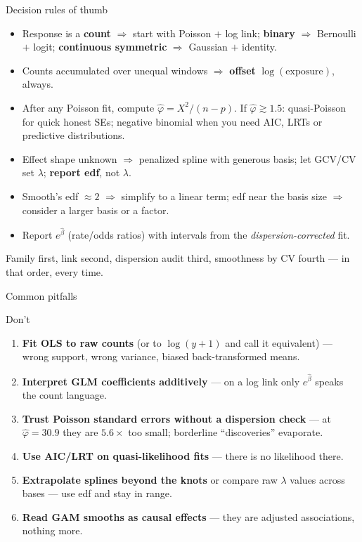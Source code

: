 \documentclass[aspectratio=169,11pt]{beamer}
\begin{document}
\begin{frame}{Decision rules of thumb}
  \begin{itemize}
    \item Response is a \textbf{count} $\Rightarrow$ start with Poisson $+$ log link;
          \textbf{binary} $\Rightarrow$ Bernoulli $+$ logit; \textbf{continuous
          symmetric} $\Rightarrow$ Gaussian $+$ identity.
    \item Counts accumulated over unequal windows $\Rightarrow$ \textbf{offset}
          $\log(\text{exposure})$, always.
    \item After any Poisson fit, compute $\hat\varphi = X^2/(n-p)$. If
          $\hat\varphi \gtrsim 1.5$: quasi-Poisson for quick honest SEs; negative
          binomial when you need AIC, LRTs or predictive distributions.
    \item Effect shape unknown $\Rightarrow$ penalized spline with generous basis;
          let GCV/CV set $\lambda$; \textbf{report edf}, not $\lambda$.
    \item Smooth's edf $\approx 2$ $\Rightarrow$ simplify to a linear term; edf near the
          basis size $\Rightarrow$ consider a larger basis or a factor.
    \item Report $e^{\hat\beta}$ (rate/odds ratios) with intervals from the
          \emph{dispersion-corrected} fit.
  \end{itemize}
  \begin{takeaway}
    Family first, link second, dispersion audit third, smoothness by CV fourth ---
    in that order, every time.
  \end{takeaway}
\end{frame}

\begin{frame}{Common pitfalls}
  \begin{alertblock}{Don't}
    \begin{enumerate}
      \item \textbf{Fit OLS to raw counts} (or to $\log(y+1)$ and call it equivalent) ---
            wrong support, wrong variance, biased back-transformed means.
      \item \textbf{Interpret GLM coefficients additively} --- on a log link only
            $e^{\hat\beta}$ speaks the count language.
      \item \textbf{Trust Poisson standard errors without a dispersion check} --- at
            $\hat\varphi = 30.9$ they are $5.6\times$ too small; borderline
            ``discoveries'' evaporate.
      \item \textbf{Use AIC/LRT on quasi-likelihood fits} --- there is no likelihood
            there.
      \item \textbf{Extrapolate splines beyond the knots} or compare raw $\lambda$
            values across bases --- use edf and stay in range.
      \item \textbf{Read GAM smooths as causal effects} --- they are adjusted
            associations, nothing more.
    \end{enumerate}
  \end{alertblock}
\end{frame}
\end{document}
